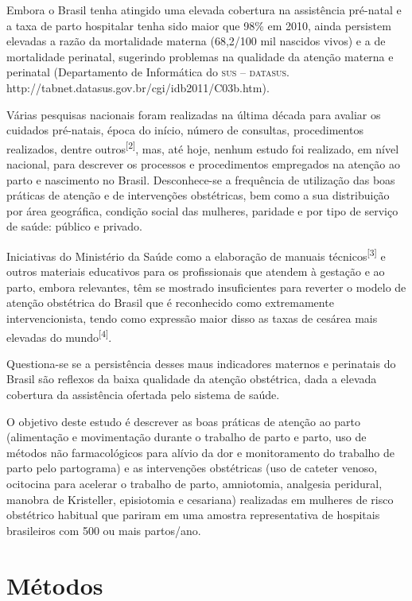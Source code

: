 \documentclass{article}
\begin{document}
Embora o Brasil tenha atingido uma elevada cobertura na assistência pré-natal e
a
taxa de parto hospitalar tenha sido maior que 98\% em 2010, ainda persistem
elevadas
a razão da mortalidade materna (68,2/100 mil nascidos vivos) e a de mortalidade
perinatal, sugerindo problemas na qualidade da atenção materna e perinatal
(Departamento de Informática do \textsc{sus} – \textsc{datasus}.
http://tabnet.datasus.gov.br/cgi/idb2011/C03b.htm).

Várias pesquisas nacionais foram realizadas na última década para avaliar os
cuidados
pré-natais, época do início, número de consultas, procedimentos realizados,
dentre
outros\textsuperscript{[}\textsuperscript{2}\textsuperscript{]}, mas, até hoje, nenhum
estudo foi realizado, em nível nacional, para descrever os processos e
procedimentos
empregados na atenção ao parto e nascimento no Brasil. Desconhece-se a
frequência de
utilização das boas práticas de atenção e de intervenções obstétricas, bem como
a
sua distribuição por área geográfica, condição social das mulheres, paridade e
por
tipo de serviço de saúde: público e privado.

Iniciativas do Ministério da Saúde como a elaboração de manuais técnicos\textsuperscript{[}\textsuperscript{3}\textsuperscript{]}
e outros materiais educativos para
os profissionais que atendem à gestação e ao parto, embora relevantes, têm se
mostrado insuficientes para reverter o modelo de atenção obstétrica do Brasil
que é
reconhecido como extremamente intervencionista, tendo como expressão maior disso
as
taxas de cesárea mais elevadas do mundo\textsuperscript{[}\textsuperscript{4}\textsuperscript{]}.

Questiona-se se a persistência desses maus indicadores maternos e perinatais do
Brasil são reflexos da baixa qualidade da atenção obstétrica, dada a elevada
cobertura da assistência ofertada pelo sistema de saúde.

O objetivo deste estudo é descrever as boas práticas de atenção ao parto
(alimentação
e movimentação durante o trabalho de parto e parto, uso de métodos não
farmacológicos para alívio da dor e monitoramento do trabalho de parto pelo
partograma) e as intervenções obstétricas (uso de cateter venoso, ocitocina para
acelerar o trabalho de parto, amniotomia, analgesia peridural, manobra de
Kristeller, episiotomia e cesariana) realizadas em mulheres de risco obstétrico
habitual que pariram em uma amostra representativa de hospitais brasileiros com
500
ou mais partos/ano.

\section{Métodos}
\end{document}
